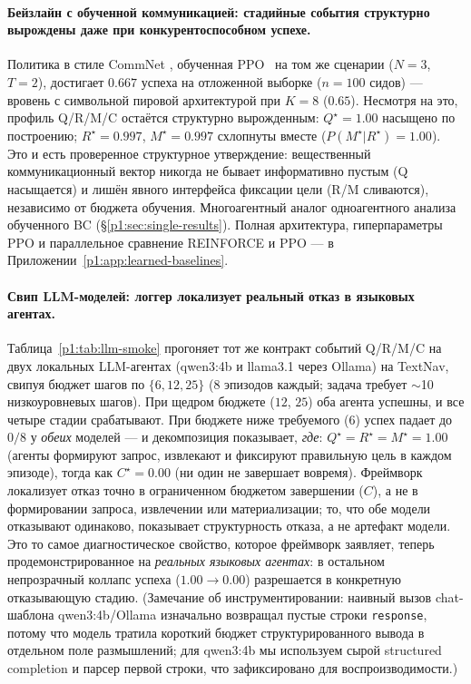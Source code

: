 \documentclass{article}
\begin{document}
\paragraph{Бейзлайн с обученной коммуникацией: стадийные события структурно вырождены даже при конкурентоспособном успехе.}
Политика в стиле CommNet \citep{sukhbaatar2016commnet}, обученная PPO~\citep{schulman2017proximal} на том же сценарии ($N{=}3$, $T{=}2$), достигает $0.667$ успеха на отложенной выборке ($n{=}100$ сидов) --- вровень с символьной пировой архитектурой при $K{=}8$ ($0.65$). Несмотря на это, профиль Q/R/M/C остаётся структурно вырожденным: $Q^\star{=}1.00$ насыщено по построению; $R^\star{=}0.997$, $M^\star{=}0.997$ схлопнуты вместе ($P(M^\star|R^\star){=}1.00$). Это и есть проверенное структурное утверждение: вещественный коммуникационный вектор никогда не бывает информативно пустым (Q насыщается) и лишён явного интерфейса фиксации цели (R/M сливаются), независимо от бюджета обучения. Многоагентный аналог одноагентного анализа обученного BC (\S\ref{p1:sec:single-results}). Полная архитектура, гиперпараметры PPO и параллельное сравнение REINFORCE и PPO --- в Приложении~\ref{p1:app:learned-baselines}.

\paragraph{Свип LLM-моделей: логгер локализует реальный отказ в языковых агентах.}
Таблица~\ref{p1:tab:llm-smoke} прогоняет тот же контракт событий Q/R/M/C на двух локальных LLM-агентах (qwen3:4b и llama3.1 через Ollama) на TextNav, свипуя бюджет шагов по $\{6,12,25\}$ ($8$ эпизодов каждый; задача требует $\sim$10 низкоуровневых шагов). При щедром бюджете ($12$, $25$) оба агента успешны, и все четыре стадии срабатывают. При бюджете ниже требуемого ($6$) успех падает до $0/8$ у \emph{обеих} моделей --- и декомпозиция показывает, \emph{где}: $Q^\star{=}R^\star{=}M^\star{=}1.00$ (агенты формируют запрос, извлекают и фиксируют правильную цель в каждом эпизоде), тогда как $C^\star{=}0.00$ (ни один не завершает вовремя). Фреймворк локализует отказ точно в ограниченном бюджетом завершении ($C$), а не в формировании запроса, извлечении или материализации; то, что обе модели отказывают одинаково, показывает структурность отказа, а не артефакт модели. Это то самое диагностическое свойство, которое фреймворк заявляет, теперь продемонстрированное на \emph{реальных языковых агентах}: в остальном непрозрачный коллапс успеха ($1.00\to0.00$) разрешается в конкретную отказывающую стадию. (Замечание об инструментировании: наивный вызов chat-шаблона qwen3:4b/Ollama изначально возвращал пустые строки \texttt{response}, потому что модель тратила короткий бюджет структурированного вывода в отдельном поле размышлений; для qwen3:4b мы используем сырой structured completion и парсер первой строки, что зафиксировано для воспроизводимости.)
\end{document}

